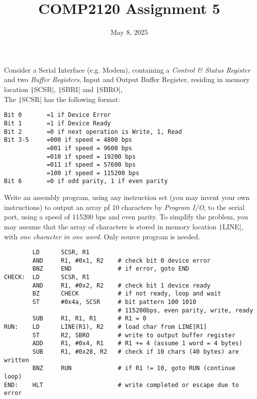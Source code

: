\documentclass[answers]{exam}
\title{COMP2120 Assignment 5}
\date{May 8, 2025}
\begin{document}
\maketitle
\begin{questions}

    \question Consider a Serial Interface (e.g. Modem),
    containing a \textit{Control \& Status Register} and two \textit{Buffer Registers}, Input and Output Buffer Register,
    residing in memory location \texttt|SCSR|, \texttt|SBRI| and \texttt|SBRO|, \\
    The \texttt|SCSR| has the following format:

    \begin{verbatim}
Bit 0       =1 if Device Error
Bit 1       =1 if Device Ready
Bit 2       =0 if next operation is Write, 1, Read
Bit 3-5     =000 if speed = 4800 bps
            =001 if speed = 9600 bps
            =010 if speed = 19200 bps
            =011 if speed = 57600 bps
            =100 if speed = 115200 bps
Bit 6       =0 if odd parity, 1 if even parity
    \end{verbatim}

    Write an assembly program, using any instruction set (you may invent your own instructions) to output an array pf 10 characters by \textit{Program I/O}, to the serial port, using a speed of 115200 bps and even parity.
    To simplify the problem, you may assume that the array of characters is stored in memory location \texttt|LINE|, with \textit{one character in one word}.
    Only source program is needed.

    \begin{solution}
        \begin{verbatim}
        LD      SCSR, R1
        AND     R1, #0x1, R2    # check bit 0 device error
        BNZ     END             # if error, goto END
CHECK:  LD      SCSR, R1
        AND     R1, #0x2, R2    # check bit 1 device ready
        BZ      CHECK           # if not ready, loop and wait
        ST      #0x4a, SCSR     # bit pattern 100 1010
                                # 115200bps, even parity, write, ready
        SUB     R1, R1, R1      # R1 = 0
RUN:    LD      LINE(R1), R2    # load char from LINE[R1]
        ST      R2, SBRO        # write to output buffer register
        ADD     R1, #0x4, R1    # R1 += 4 (assume 1 word = 4 bytes)
        SUB     R1, #0x28, R2   # check if 10 chars (40 bytes) are written
        BNZ     RUN             # if R1 != 10, goto RUN (continue loop)
END:    HLT                     # write completed or escape due to error
        \end{verbatim}
    \end{solution}


\end{questions}
\end{document}
